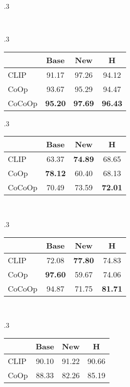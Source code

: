 \documentclass[10pt,twocolumn,letterpaper]{article}
\begin{document}
\begin{table*}[t]
\begin{subtable}[t]{.3\textwidth}
    \end{subtable}
    ~
    \begin{subtable}[t]{.3\textwidth}
    \centering
    \caption{OxfordPets.}
    \begin{tabular}{l cc|c}
    \toprule
    & Base & New & H \\
    \midrule
    CLIP & 91.17 & 97.26 & 94.12 \\
    CoOp & 93.67 & 95.29 & 94.47 \\
    \rowcolor{tabhighlight}
    CoCoOp & \textbf{95.20} & \textbf{97.69} & \textbf{96.43} \\
    \bottomrule
    \end{tabular}
    \end{subtable}
    \vspace{1em}
    \begin{subtable}[t]{.3\textwidth}
    \centering
    \caption{StanfordCars.}
    \begin{tabular}{l cc|c}
    \toprule
    & Base & New & H \\
    \midrule
    CLIP & 63.37 & \textbf{74.89} & 68.65 \\
    CoOp & \textbf{78.12} & 60.40 & 68.13 \\
    \rowcolor{tabhighlight}
    CoCoOp & 70.49 & 73.59 & \textbf{72.01} \\
    \bottomrule
    \end{tabular}
    \end{subtable}
    ~
    \begin{subtable}[t]{.3\textwidth}
    \centering
    \caption{Flowers102.}
    \begin{tabular}{l cc|c}
    \toprule
    & Base & New & H \\
    \midrule
    CLIP & 72.08 & \textbf{77.80} & 74.83 \\
    CoOp & \textbf{97.60} & 59.67 & 74.06 \\
    \rowcolor{tabhighlight}
    CoCoOp & 94.87 & 71.75 & \textbf{81.71} \\
    \bottomrule
    \end{tabular}
    \end{subtable}
    ~
    \begin{subtable}[t]{.3\textwidth}
    \centering
    \caption{Food101.}
    \begin{tabular}{l cc|c}
    \toprule
    & Base & New & H \\
    \midrule
    CLIP & 90.10 & 91.22 & 90.66 \\
    CoOp & 88.33 & 82.26 & 85.19 \\

\end{tabular}
\end{subtable}
\end{table*}
\end{document}
